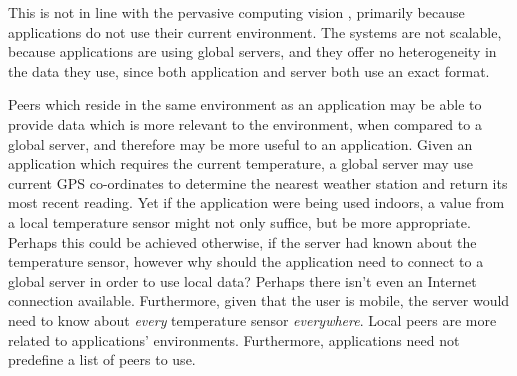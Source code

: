 \documentclass[12pt,twoside,notitlepage]{report}
\begin{document}
This is not in line with the pervasive computing vision \cite{weiser1991computer}, primarily because applications do not use their current environment. 
The systems are not scalable, because applications are using global servers, and they offer no heterogeneity\cite{saha2003pervasive} in the data they use, since both application and server both use an exact format.

Peers which reside in the same environment as an application may be able to provide data which is more relevant to the environment, when compared to a global server, and therefore may be more useful to an application. 
Given an application which requires the current temperature, a global server may use current GPS co-ordinates to determine the nearest weather station and return its most recent reading. 
Yet if the application were being used indoors, a value from a local temperature sensor might not only suffice, but be more appropriate. 
Perhaps this could be achieved otherwise, if the server had known about the temperature sensor, however why should the application need to connect to a global server in order to use local data? Perhaps there isn't even an Internet connection available. 
Furthermore, given that the user is mobile, the server would need to know about {\sl every} temperature sensor {\sl everywhere}. 
Local peers are more related to applications' environments. 
Furthermore, applications need not predefine a list of peers to use.
\end{document}
